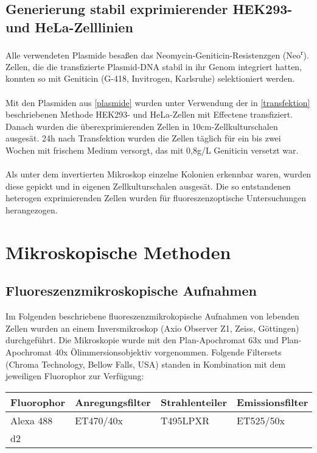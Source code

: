 \subsection{Generierung stabil exprimierender HEK293- und HeLa-Zelllinien}
Alle verwendeten Plasmide besaßen das Neomycin-Geniticin-Resistenzgen (Neo\textsuperscript{r}). Zellen, die die transfizierte Plasmid-DNA stabil in ihr Genom integriert hatten, konnten so mit Geniticin (G-418, Invitrogen, Karlsruhe) selektioniert werden.\\
\\
Mit den Plasmiden aus \ref{plasmide} wurden unter Verwendung der in \ref{transfektion} beschriebenen Methode HEK293- und HeLa-Zellen mit Effectene transfiziert. Danach wurden die überexprimierenden Zellen in 10\si{\centi\meter}-Zellkulturschalen ausgesät. 24\si{\hour} nach Transfektion wurden die Zellen täglich für ein bis zwei Wochen mit frischem Medium versorgt, das mit 0,8\si{\gram/\liter} Geniticin versetzt war. 
\\ \\
Als unter dem invertierten Mikroskop einzelne Kolonien erkennbar waren, wurden diese gepickt und in eigenen Zellkulturschalen ausgesät. Die so entstandenen heterogen exprimierenden Zellen wurden für fluoreszenzoptische Untersuchungen herangezogen. 

\section{Mikroskopische Methoden}\label{mikroskopie}
\subsection{Fluoreszenzmikroskopische Aufnahmen}
Im Folgenden beschriebene fluoreszenzmikrokopische Aufnahmen von lebenden Zellen wurden an einem Inversmikroskop (Axio Observer Z1, Zeiss, Göttingen) durchgeführt. Die Mikroskopie wurde mit den Plan-Apochromat 63x und Plan-Apochromat 40x Ölimmersionsobjektiv vorgenommen. Folgende Filtersets (Chroma Technology, Bellow Falls, USA) standen in Kombination mit dem jeweiligen Fluorophor zur Verfügung:

\begin{table}[htsb]
\begin{tabularx}{\textwidth}{llll}
	\toprule
	Fluorophor 	& Anregungsfilter	& Strahlenteiler		& Emissionsfilter\\
	\midrule
	Alexa 488 	& ET470/40x 			& T495LPXR 			& ET525/50x \\
	d2			& & & \\
	\bottomrule
\end{tabularx}
\end{table}

